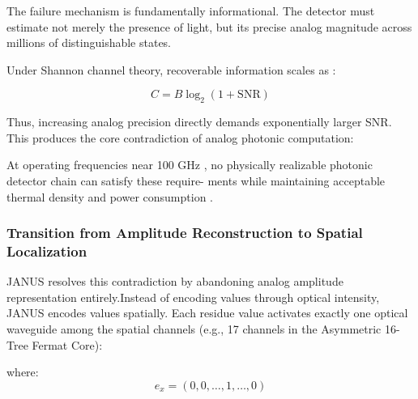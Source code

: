 \documentclass[journal]{IEEEtran}
\begin{document}
The failure mechanism is fundamentally informational. The detector must estimate not merely the presence of light, but its precise analog magnitude across millions of distinguishable states.

Under Shannon channel theory, recoverable information scales as \cite{Winzer2006}\cite{Saleh2019}:

\begin{equation}
C = B\log_{2}\left(1 + \mathrm{SNR}\right)
\end{equation}

Thus, increasing analog precision directly demands exponentially larger SNR. This produces the core contradiction of analog photonic
computation:

\begin{center}
\end{center}

At operating frequencies near 100 GHz , no physically realizable photonic detector chain can satisfy these require-
ments while maintaining acceptable thermal density and power consumption \cite{Steckler2024}\cite{Chen2025}\cite{Liu2021}.

\subsubsection{\textbf{Transition from Amplitude Reconstruction to Spatial Localization}}
 
JANUS resolves this contradiction by abandoning analog amplitude representation entirely.Instead of encoding values through optical intensity, JANUS encodes values spatially. Each residue value activates exactly one optical waveguide among the spatial channels (e.g., 17 channels in the Asymmetric 16-Tree Fermat Core):

\begin{center}
\label{eq:onehot_mapping}
\end{center}

where:
\begin{equation}
e_x = (0, 0, \dots, 1, \dots, 0)
\end{equation}
\end{document}
